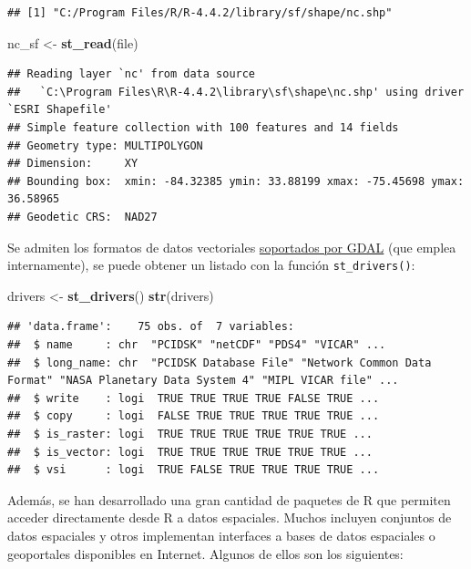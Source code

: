 \documentclass[
]{book}
\newenvironment{Shaded}{\begin{snugshade}}{\end{snugshade}}
\newcommand{\FunctionTok}[1]{\textcolor[rgb]{0.13,0.29,0.53}{\textbf{#1}}}
\newcommand{\NormalTok}[1]{#1}
\newcommand{\OtherTok}[1]{\textcolor[rgb]{0.56,0.35,0.01}{#1}}
\theoremstyle{break}
\theoremstyle{definition}
\theoremstyle{definition}
\theoremstyle{definition}
\theoremstyle{definition}
\theoremstyle{remark}
\begin{document}
\begin{verbatim}
## [1] "C:/Program Files/R/R-4.4.2/library/sf/shape/nc.shp"
\end{verbatim}

\begin{Shaded}
\begin{Highlighting}[]
\NormalTok{nc\_sf }\OtherTok{\textless{}{-}} \FunctionTok{st\_read}\NormalTok{(file)}
\end{Highlighting}
\end{Shaded}

\begin{verbatim}
## Reading layer `nc' from data source 
##   `C:\Program Files\R\R-4.4.2\library\sf\shape\nc.shp' using driver `ESRI Shapefile'
## Simple feature collection with 100 features and 14 fields
## Geometry type: MULTIPOLYGON
## Dimension:     XY
## Bounding box:  xmin: -84.32385 ymin: 33.88199 xmax: -75.45698 ymax: 36.58965
## Geodetic CRS:  NAD27
\end{verbatim}

Se admiten los formatos de datos vectoriales \href{https://gdal.org/drivers/vector/index.html}{soportados por GDAL} (que emplea internamente),
se puede obtener un listado con la función \texttt{st\_drivers()}:

\begin{Shaded}
\begin{Highlighting}[]
\NormalTok{drivers }\OtherTok{\textless{}{-}} \FunctionTok{st\_drivers}\NormalTok{()}
\FunctionTok{str}\NormalTok{(drivers)}
\end{Highlighting}
\end{Shaded}

\begin{verbatim}
## 'data.frame':    75 obs. of  7 variables:
##  $ name     : chr  "PCIDSK" "netCDF" "PDS4" "VICAR" ...
##  $ long_name: chr  "PCIDSK Database File" "Network Common Data Format" "NASA Planetary Data System 4" "MIPL VICAR file" ...
##  $ write    : logi  TRUE TRUE TRUE TRUE FALSE TRUE ...
##  $ copy     : logi  FALSE TRUE TRUE TRUE TRUE TRUE ...
##  $ is_raster: logi  TRUE TRUE TRUE TRUE TRUE TRUE ...
##  $ is_vector: logi  TRUE TRUE TRUE TRUE TRUE TRUE ...
##  $ vsi      : logi  TRUE FALSE TRUE TRUE TRUE TRUE ...
\end{verbatim}

Además, se han desarrollado una gran cantidad de paquetes de R que permiten acceder directamente desde R a datos espaciales.
Muchos incluyen conjuntos de datos espaciales y otros implementan interfaces a bases de datos espaciales o geoportales disponibles en Internet.
Algunos de ellos son los siguientes:
\end{document}
